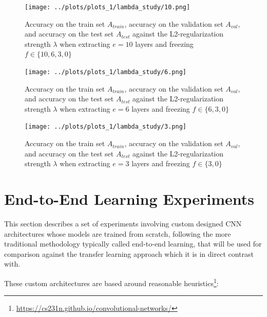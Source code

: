 \begin{figure}[ht]
    \centering
    \texttt{[image: ../plots/plots\_1/lambda\_study/10.png]}
    \caption{Accuracy on the train set $A_{train}$, accuracy on the validation set $A_{val}$, and accuracy on the test set $A_{test}$ against the L2-regularization strength $\lambda$ when extracting $e = 10$ layers and freezing $f \in \{10, 6, 3, 0\}$}
    \label{fig:results_1_10}
\end{figure}

\begin{figure}[ht]
    \centering
    \texttt{[image: ../plots/plots\_1/lambda\_study/6.png]}
    \caption{Accuracy on the train set $A_{train}$, accuracy on the validation set $A_{val}$, and accuracy on the test set $A_{test}$ against the L2-regularization strength $\lambda$ when extracting $e = 6$ layers and freezing $f \in \{6, 3, 0\}$}
    \label{fig:results_1_6}
\end{figure}

\begin{figure}[ht]
    \centering
    \texttt{[image: ../plots/plots\_1/lambda\_study/3.png]}
    \caption{Accuracy on the train set $A_{train}$, accuracy on the validation set $A_{val}$, and accuracy on the test set $A_{test}$ against the L2-regularization strength $\lambda$ when extracting $e = 3$ layers and freezing $f \in \{3, 0\}$}
    \label{fig:results_1_3}
\end{figure}


\section{End-to-End Learning Experiments}

This section describes a set of experiments involving custom designed \ac{CNN} architectures whose models are trained from scratch, following the more traditional methodology typically called end-to-end learning, that will be used for comparison against the transfer learning approach which it is in direct contrast with.

These custom architectures are based around reasonable heuristics\footnote{\url{https://cs231n.github.io/convolutional-networks/}}:

